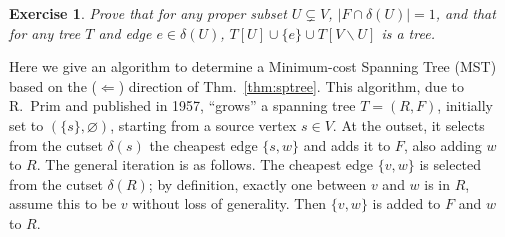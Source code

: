 \documentclass[a4paper]{book}
\theoremstyle{changebreak}                %
\newtheorem{ex}[result]{Exercise}
\begin{document}
\begin{ex}
Prove that for any proper subset $U\subsetneq V$,
$|F\cap\delta(U)|=1$, and that for any tree $T$ and edge
$e\in\delta(U)$, $T[U]\cup\{e\}\cup T[V\smallsetminus U]$ is a tree.
\end{ex}

Here we give an algorithm to determine a Minimum-cost Spanning
Tree (MST) based on the
($\Leftarrow$) direction of Thm.~\ref{thm:sptree}. This
algorithm, due to R.~Prim  and
published in 1957, ``grows'' a spanning tree $T=(R,F)$, initially set
to $(\{s\},\varnothing)$, starting from a source
vertex $s\in V$. At the outset, it selects from
the cutset $\delta(s)$ the cheapest edge $\{s,w\}$ and
adds it to $F$, also adding $w$ to $R$. The general iteration is as
follows. The cheapest edge $\{v,w\}$ is selected
from the cutset $\delta(R)$; by definition, exactly one between $v$
and $w$ is in $R$, assume this to be $v$ without loss of
generality. Then $\{v,w\}$ is added to $F$ and $w$ to $R$.
\end{document}
